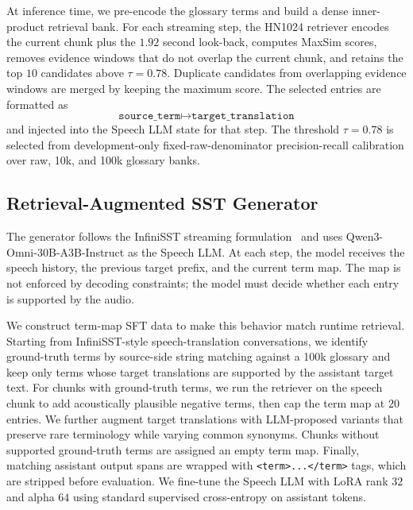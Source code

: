 At inference time, we pre-encode the glossary terms and build a dense inner-product retrieval bank. For each streaming step, the HN1024 retriever encodes the current chunk plus the $1.92$ second look-back, computes MaxSim scores, removes evidence windows that do not overlap the current chunk, and retains the top $10$ candidates above $\tau=0.78$. Duplicate candidates from overlapping evidence windows are merged by keeping the maximum score. The selected entries are formatted as
\begin{equation}
  \texttt{source\_term} \mapsto \texttt{target\_translation}
\end{equation}
and injected into the Speech LLM state for that step. The threshold $\tau=0.78$ is selected from development-only fixed-raw-denominator precision-recall calibration over raw, 10k, and 100k glossary banks.

\subsection{Retrieval-Augmented SST Generator}
\label{sec:rag_sst_generator}

The generator follows the InfiniSST streaming formulation~\citep{ouyang-etal-2025-infinisst} and uses Qwen3-Omni-30B-A3B-Instruct as the Speech LLM. At each step, the model receives the speech history, the previous target prefix, and the current term map. The map is not enforced by decoding constraints; the model must decide whether each entry is supported by the audio.

We construct term-map SFT data to make this behavior match runtime retrieval. Starting from InfiniSST-style speech-translation conversations, we identify ground-truth terms by source-side string matching against a 100k glossary and keep only terms whose target translations are supported by the assistant target text. For chunks with ground-truth terms, we run the retriever on the speech chunk to add acoustically plausible negative terms, then cap the term map at $20$ entries. We further augment target translations with LLM-proposed variants that preserve rare terminology while varying common synonyms. Chunks without supported ground-truth terms are assigned an empty term map. Finally, matching assistant output spans are wrapped with \texttt{\textless term\textgreater...\textless/term\textgreater} tags, which are stripped before evaluation. We fine-tune the Speech LLM with LoRA rank $32$ and alpha $64$ using standard supervised cross-entropy on assistant tokens.

